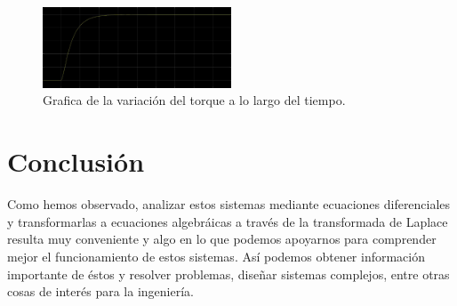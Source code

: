 \documentclass[12pt, letterpaper]{article}
\begin{document}
\begin{enumerate}
		\begin{figure}[H]
			\centering
			\includegraphics[width=0.5\textwidth]{19.png}
			\caption{Grafica de la variación del torque a lo largo del tiempo.}
		\end{figure}
\end{enumerate}
\section*{Conclusión}
Como hemos observado, analizar estos sistemas mediante ecuaciones diferenciales y transformarlas a ecuaciones algebráicas a través de la transformada de Laplace resulta muy conveniente y algo en lo que podemos apoyarnos para comprender mejor el funcionamiento de estos sistemas. Así podemos obtener información importante de éstos y resolver problemas, diseñar sistemas complejos, entre otras cosas de interés para la ingeniería.
\renewcommand\refname{Referencias}
\printbibliography
\end{document}
